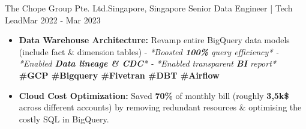 

\resumeSubheading
{The Chope Group Pte. Ltd.}{Singapore, Singapore}
{Senior Data Engineer | Tech Lead}{Mar 2022 - Mar 2023}
\begin{itemize}
    \item \textbf{Data Warehouse Architecture:} Revamp entire BigQuery data models (include fact \& dimension tables) - \emph{*Boosted \textbf{100\%} query efficiency* - *Enabled \textbf{Data lineage \& CDC}* - *Enabled transparent \textbf{BI} report*} \textbf{\scriptsize{\#GCP \#Bigquery \#Fivetran \#DBT \#Airflow}}
    \item \textbf{Cloud Cost Optimization:} Saved \textbf{70\%} of monthly bill (roughly \textbf{3,5k\$} across different accounts) by removing redundant resources \& optimising the costly SQL in BigQuery.
\end{itemize}

